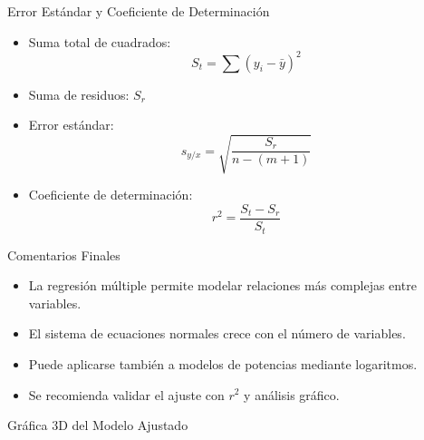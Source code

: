 \documentclass[main.tex]{subfiles}
\begin{document}
\begin{frame}{Error Estándar y Coeficiente de Determinación}
  \small
  \begin{itemize}
    \item Suma total de cuadrados:
    \[
    S_t = \sum (y_i - \bar{y})^2
    \]
    \item Suma de residuos: \(S_r\)
    \item Error estándar:
    \[
      s_{y/x} = \sqrt{\frac{S_r}{n - (m + 1)}}
    \]
    \item Coeficiente de determinación:
    \[
      r^2 = \frac{S_t - S_r}{S_t}
    \]
  \end{itemize}
\end{frame}


\begin{frame}{Comentarios Finales}
  \begin{itemize}
    \item La regresión múltiple permite modelar relaciones más complejas entre variables.
    \item El sistema de ecuaciones normales crece con el número de variables.
    \item Puede aplicarse también a modelos de potencias mediante logaritmos.
    \item Se recomienda validar el ajuste con \(r^2\) y análisis gráfico.
  \end{itemize}
\end{frame}

\begin{frame}{Gráfica 3D del Modelo Ajustado}
  \begin{center}
  \end{center}
\end{frame}
\end{document}
